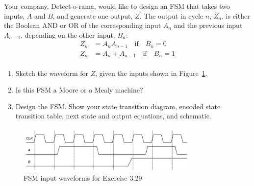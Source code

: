 \documentclass[12pt]{article}
\newenvironment{ex}[2][Exercise]{\begin{trivlist}
		\item[\hskip \labelsep {\bfseries #1}\hskip \labelsep {\bfseries #2.}]}{\end{trivlist}}
\begin{document}
\begin{ex}{3.29}
	Your company, Detect-o-rama, would like to design an FSM that takes two inputs,
	$A$ and $B$, and generate one output, $Z$. The output in cycle $n$, $Z_n$, is
	either the Boolean AND or OR of the corresponding input $A_n$ and the previous
	input $A_{n-1}$, depending on the other input, $B_n$:
	\begin{align*}
		Z_n&=A_nA_{n-1}\quad \text{if}\quad B_n=0\\
		Z_n&=A_n+A_{n-1}\quad \text{if}\quad B_n=1\\
	\end{align*}
	\begin{enumerate}[label=(\alph*)]
		\item Sketch the waveform for $Z$, given the inputs shown in Figure~\ref{03-29-input-waveform}.
		\item Is this FSM a Moore or a Mealy machine?
		\item Design the FSM. Show your state transition diagram, encoded state
		transition table, next state and output equations, and schematic.
	\end{enumerate}
	\begin{figure}
		\centering
		\includegraphics[width=0.8\textwidth]{03-29-input-waveform}
		\caption{FSM input waveforms for Exercise 3.29}
		\label{03-29-input-waveform}
	\end{figure}
\end{ex}
\end{document}
